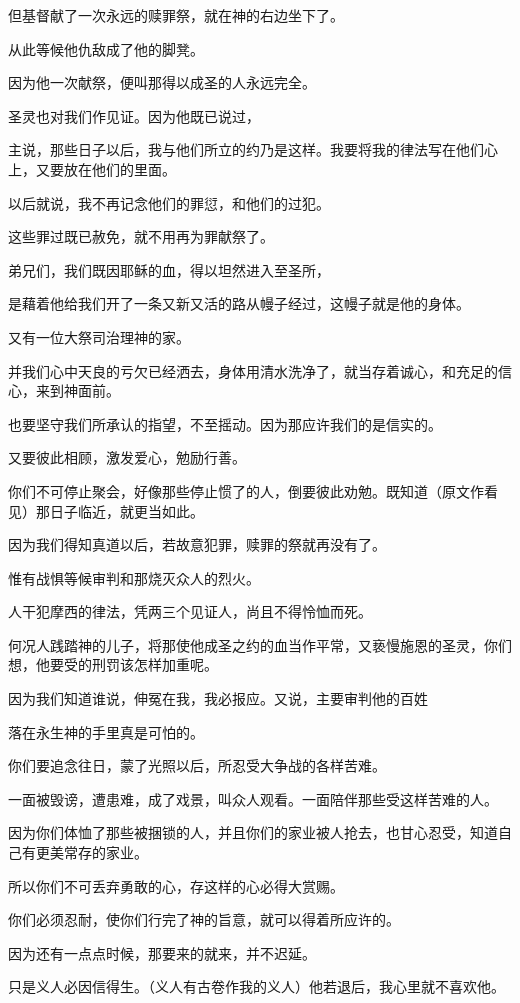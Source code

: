 \documentclass[12pt,oneside]{book}
\begin{document}
但基督献了一次永远的赎罪祭，就在神的右边坐下了。

从此等候他仇敌成了他的脚凳。

因为他一次献祭，便叫那得以成圣的人永远完全。

圣灵也对我们作见证。因为他既已说过，

主说，那些日子以后，我与他们所立的约乃是这样。我要将我的律法写在他们心上，又要放在他们的里面。

以后就说，我不再记念他们的罪愆，和他们的过犯。

这些罪过既已赦免，就不用再为罪献祭了。

弟兄们，我们既因耶稣的血，得以坦然进入至圣所，

是藉着他给我们开了一条又新又活的路从幔子经过，这幔子就是他的身体。

又有一位大祭司治理神的家。

并我们心中天良的亏欠已经洒去，身体用清水洗净了，就当存着诚心，和充足的信心，来到神面前。

也要坚守我们所承认的指望，不至摇动。因为那应许我们的是信实的。

又要彼此相顾，激发爱心，勉励行善。

你们不可停止聚会，好像那些停止惯了的人，倒要彼此劝勉。既知道（原文作看见）那日子临近，就更当如此。

因为我们得知真道以后，若故意犯罪，赎罪的祭就再没有了。

惟有战惧等候审判和那烧灭众人的烈火。

人干犯摩西的律法，凭两三个见证人，尚且不得怜恤而死。

何况人践踏神的儿子，将那使他成圣之约的血当作平常，又亵慢施恩的圣灵，你们想，他要受的刑罚该怎样加重呢。

因为我们知道谁说，伸冤在我，我必报应。又说，主要审判他的百姓

落在永生神的手里真是可怕的。

你们要追念往日，蒙了光照以后，所忍受大争战的各样苦难。

一面被毁谤，遭患难，成了戏景，叫众人观看。一面陪伴那些受这样苦难的人。

因为你们体恤了那些被捆锁的人，并且你们的家业被人抢去，也甘心忍受，知道自己有更美常存的家业。

所以你们不可丢弃勇敢的心，存这样的心必得大赏赐。

你们必须忍耐，使你们行完了神的旨意，就可以得着所应许的。

因为还有一点点时候，那要来的就来，并不迟延。

只是义人必因信得生。（义人有古卷作我的义人）他若退后，我心里就不喜欢他。
\end{document}
